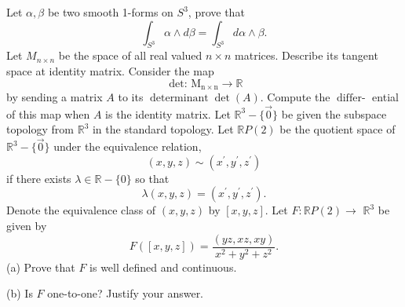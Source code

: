 \documentclass[14pt]{extarticle}
\begin{document}
Let $\alpha, \beta$ be two smooth 1-forms on $S^{3}$, prove that
$$
\int_{S^{3}} \alpha \wedge d \beta=\int_{S^{3}} d \alpha \wedge \beta .
$$
\newpage
Let $M_{n \times n}$ be the space of all real valued $n \times n$ matrices. Describe its tangent space at identity matrix. Consider the map
$$
\text { det: } \mathrm{M}_{\mathrm{n} \times \mathrm{n}} \rightarrow \mathbb{R}
$$
by sending a matrix $A$ to its $\operatorname{determinant} \operatorname{det}(A)$. Compute the $\operatorname{differ-}$ ential of this map when $A$ is the identity matrix.
\newpage
Let $\mathbb{R}^{3}-\{\overrightarrow{0}\}$ be given the subspace topology from $\mathbb{R}^{3}$ in the standard topology. Let $\mathbb{R} P(2)$ be the quotient space of $\mathbb{R}^{3}-\{\overrightarrow{0}\}$ under the equivalence relation,
$$
(x, y, z) \sim\left(x^{\prime}, y^{\prime}, z^{\prime}\right)
$$
if there exists $\lambda \in \mathbb{R}-\{0\}$ so that
$$
\lambda(x, y, z)=\left(x^{\prime}, y^{\prime}, z^{\prime}\right) .
$$
Denote the equivalence class of $(x, y, z)$ by $[x, y, z]$. Let $F: \mathbb{R} P(2) \rightarrow$ $\mathbb{R}^{3}$ be given by
$$
F([x, y, z])=\frac{(y z, x z, x y)}{x^{2}+y^{2}+z^{2}} .
$$
(a) Prove that $F$ is well defined and continuous.

(b) Is $F$ one-to-one? Justify your answer.
\end{document}

